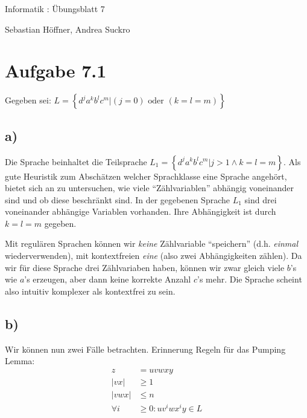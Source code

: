 \documentclass{article}
\begin{document}
\begin{center}
  \Large{Informatik \revD: Übungsblatt 7}

  \large{Sebastian Höffner, Andrea Suckro}
\end{center}



\section*{Aufgabe 7.1}
Gegeben sei: $L=\left\{d^ja^kb^lc^m | (j=0)\text{ oder }(k=l=m) \right\}$

\subsection*{a)}

Die Sprache beinhaltet die Teilsprache $L_1=\left\{d^ja^kb^lc^m | j>1 \wedge k=l=m \right\}$. Als gute Heuristik zum Abschätzen welcher Sprachklasse eine Sprache angehört, bietet sich an zu untersuchen, wie viele "`Zählvariablen"' abhängig voneinander sind und ob diese beschränkt sind. In der gegebenen Sprache $L_1$ sind drei voneinander abhängige Variablen vorhanden. Ihre Abhängigkeit ist durch $k=l=m$ gegeben. 

Mit regulären Sprachen können wir \emph{keine} Zählvariable "`speichern"' (d.h. \emph{einmal} wiederverwenden), mit kontextfreien \emph{eine} (also zwei Abhängigkeiten zählen). Da wir für diese Sprache drei Zählvariaben haben, können wir zwar gleich viele $b$'s wie $a$'s erzeugen, aber dann keine korrekte Anzahl $c$'s mehr. Die Sprache scheint also intuitiv komplexer als kontextfrei zu sein.

\subsection*{b)}
Wir können nun zwei Fälle betrachten. Erinnerung Regeln für das Pumping Lemma:
\begin{align*}
z &= uvwxy \\
|vx| &\geq 1\\
|vwx| &\leq n \\
\forall i &\geq 0: uv^iwx^iy\in L 
\end{align*}
\end{document}
